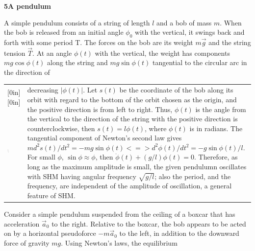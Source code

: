 \documentclass[a4paper,12pt,oneside]{report}
\newenvironment{tree}[4]{
\begin{list}{#1}{\parskip=0in \topsep=0in \itemsep=0in \parsep=0in \partopsep=0in \leftmargin=#2 \rightmargin=#3 \itemindent=#4 \listparindent=\itemindent}
}{\end{list}}
\newenvironment{ssection}[5]{
\phantom{#1}\textbf{#2\space#3}
\begin{tree}{#4}{0in}{0in}{#5}
}{\end{tree}}
\begin{document}
\begin{ssection}{\space}{5}{A pendulum}{\textbullet}{\parindent}
\item A simple pendulum consists of a string of length $l$ and a bob of mass $m$. When the bob is released from an initial angle $\phi_{0}$ with the vertical, it swings back and forth with some period T. The forces on the bob are its weight $m\vec{g}$ and the string tension $\vec{T}$. At an angle $\phi(t)$ with the vertical, the weight has components $mg\cos\phi(t)$ along the string and $mg\sin\phi(t)$ tangential to the circular arc in the direction of\\
\begin{tabular}{p{}p{}}
\raisebox{-128pt}[0in][0in]{\includegraphics[width=0.13\textwidth,height=136pt]{figures/13Dec3.pdf}}
& decreasing $|\phi(t)|$. Let $s(t)$ be the coordinate of the bob along its orbit with regard to the bottom of the orbit chosen as the origin, and the positive direction is from left to right. Thus, $\phi(t)$ is the angle from the vertical to the direction of the string with the positive direction is counterclockwise, then $s(t)=l\phi(t)$, where $\phi(t)$ is in radians. The tangential component of Newton's second law gives $md^{2}s(t)/dt^{2}=-mg\sin\phi(t)<=>d^{2}\phi(t)/dt^{2}=-g\sin\phi(t)/l$. For small $\phi$, $\sin\phi\approx\phi$, then $\ddot{\phi}(t)+(g/l)\phi(t)=0$. Therefore, as long as the maximum amplitude is small, the given pendulumn oscillates with SHM having angular frequency $\sqrt{g/l}$; also the period, and the frequency, are independent of the amplitude of oscillation, a general feature of SHM.
\end{tabular}
\item Consider a simple pendulum suspended from the ceiling of a boxcar that has acceleration $\vec{a}_{0}$ to the right. Relative to the boxcar, the bob appears to be acted on by a horizontal pseudoforce $-m\vec{a}_{0}$ to the left, in addition to the downward force of gravity $mg$. Using Newton's laws, the equilibrium\\

\end{ssection}
\end{document}
